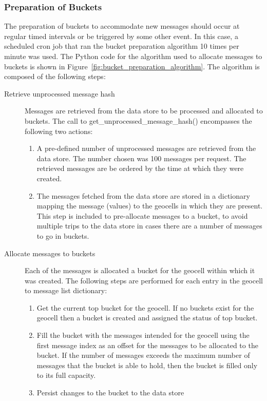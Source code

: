 \documentclass{article}
\begin{document}
\subsubsection{Preparation of Buckets} %
\label{ssub:preparation_of_buckets}

The preparation of buckets to accommodate new messages should occur at regular timed intervals or be triggered by some other event. In this case, a scheduled cron job that ran the bucket preparation algorithm 10 times per minute was used. The Python code for the algorithm used to allocate messages to buckets is shown in Figure~\ref{fig:bucket_preparation_algorithm}. The algorithm is composed of the following steps:

\begin{description}
	\item[Retrieve unprocessed message hash] {Messages are retrieved from the data store to be processed and allocated to buckets. The call to get\_unprocessed\_message\_hash() encompasses the following two actions:

	\begin{enumerate}
		\item A pre-defined number of unprocessed messages are retrieved from the data store. The number chosen was 100 messages per request. The retrieved messages are be ordered by the time at which they were created.
		\item The messages fetched from the data store are stored in a dictionary mapping the message (values) to the geocells in which they are present. This step is included to pre-allocate messages to a bucket, to avoid multiple trips to the data store in cases there are a number of messages to go in buckets.
	\end{enumerate}}
	
	\item[Allocate messages to buckets] Each of the messages is allocated a bucket for the geocell within which it was created. The following steps are performed for each entry in the geocell to message list dictionary:
	
	\begin{enumerate}
		\item Get the current top bucket for the geocell. If no buckets exist for the geocell then a bucket is created and assigned the status of top bucket.
		\item Fill the bucket with the messages intended for the geocell using the first message index as an offset for the messages to be allocated to the bucket. If the number of messages exceeds the maximum number of messages that the bucket is able to hold, then the bucket is filled only to its full capacity.
		\item Persist changes to the bucket to the data store
		

\end{enumerate}
\end{description}
\end{document}
